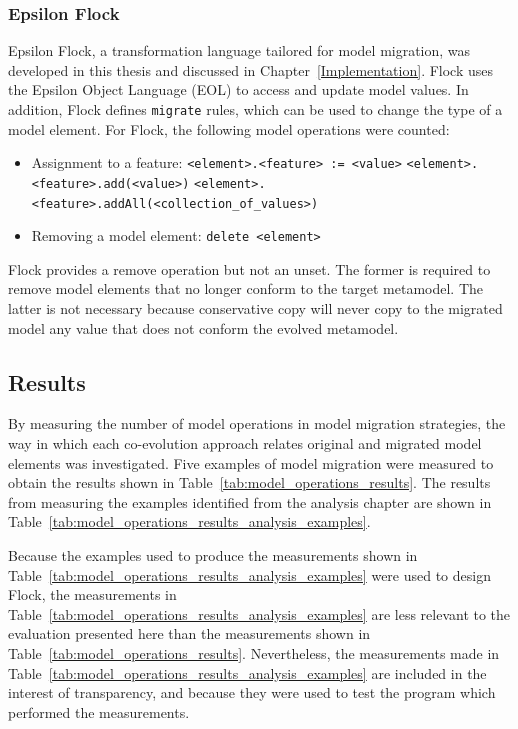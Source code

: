 \subsubsection{Epsilon Flock}
Epsilon Flock, a transformation language tailored for model migration, was developed in this thesis and discussed in Chapter~\ref{Implementation}. Flock uses the Epsilon Object Language (EOL) \cite{kolovos06eol} to access and update model values. In addition, Flock defines \texttt{migrate} rules, which can be used to change the type of a model element. For Flock, the following model operations were counted:

\begin{itemize}
	\item Assignment to a feature:
	\subitem \texttt{<element>.<feature> := <value>} 
	\subitem \texttt{<element>.<feature>.add(<value>)}
	\subitem \texttt{<element>.<feature>.addAll(<collection\_of\_values>)}
	
	\item Removing a model element:
	\subitem \texttt{delete <element>}
\end{itemize}

Flock provides a remove operation but not an unset. The former is required to remove model elements that no longer conform to the target metamodel. The latter is not necessary because conservative copy will never copy to the migrated model any value that does not conform the evolved metamodel. 


\subsection{Results}
\label{subsubsec:quantitive_results}
By measuring the number of model operations in model migration strategies, the way in which each co-evolution approach relates original and migrated model elements was investigated. Five examples of model migration were measured to obtain the results shown in Table~\ref{tab:model_operations_results}. The results from measuring the examples identified from the analysis chapter are shown in Table~\ref{tab:model_operations_results_analysis_examples}.

Because the examples used to produce the measurements shown in Table~\ref{tab:model_operations_results_analysis_examples} were used to design Flock, the measurements in Table~\ref{tab:model_operations_results_analysis_examples} are less relevant to the evaluation presented here than the measurements shown in Table~\ref{tab:model_operations_results}. Nevertheless, the measurements made in Table~\ref{tab:model_operations_results_analysis_examples} are included in the interest of transparency, and because they were used to test the program which performed the measurements.

